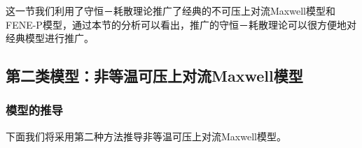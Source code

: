 	这一节我们利用了守恒－耗散理论推广了经典的不可压上对流Maxwell模型和FENE-P模型，通过本节的分析可以看出，推广的守恒－耗散理论可以很方便地对经典模型进行推广。

	\subsection{第二类模型：非等温可压上对流Maxwell模型}
	\subsubsection{模型的推导}
	下面我们将采用第二种方法推导非等温可压上对流Maxwell模型。

